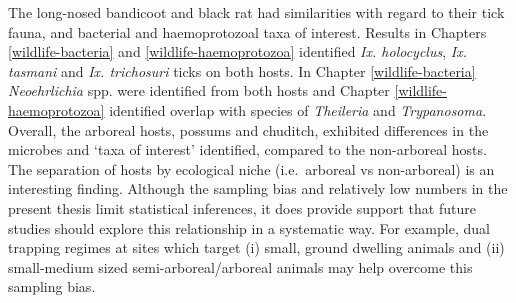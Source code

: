 \documentclass[a4paper, nobind]{templates/ociamthesis}
\begin{document}
The long-nosed bandicoot and black rat had similarities with regard to their tick fauna, and bacterial and haemoprotozoal taxa of interest.
Results in Chapters \ref{wildlife-bacteria} and \ref{wildlife-haemoprotozoa} identified \emph{Ix. holocyclus}, \emph{Ix. tasmani} and \emph{Ix. trichosuri} ticks on both hosts.
In Chapter \ref{wildlife-bacteria} \emph{Neoehrlichia} spp. were identified from both hosts and Chapter \ref{wildlife-haemoprotozoa} identified overlap with species of \emph{Theileria} and \emph{Trypanosoma}.
Overall, the arboreal hosts, possums and chuditch, exhibited differences in the microbes and `taxa of interest' identified, compared to the non-arboreal hosts.
The separation of hosts by ecological niche (i.e.~arboreal vs non-arboreal) is an interesting finding.
Although the sampling bias and relatively low numbers in the present thesis limit statistical inferences, it does provide support that future studies should explore this relationship in a systematic way.
For example, dual trapping regimes at sites which target (i) small, ground dwelling animals and (ii) small-medium sized semi-arboreal/arboreal animals may help overcome this sampling bias.
\end{document}
